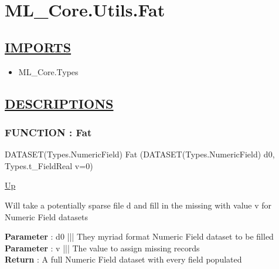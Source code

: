 \chapter*{ML\_Core.Utils.Fat}
\hypertarget{ecldoc:toc:ML_Core.Utils.Fat}{}

\section*{\underline{IMPORTS}}
\begin{itemize}
\item ML\_Core.Types
\end{itemize}

\section*{\underline{DESCRIPTIONS}}
\subsection*{FUNCTION : Fat}
\hypertarget{ecldoc:ml_core.utils.fat}{}
\begin{minipage}[t]{\textwidth}
\begin{flushleft}
DATASET(Types.NumericField) Fat (DATASET(Types.NumericField) d0, Types.t\_FieldReal v=0)
\end{flushleft}
\end{minipage}
\hyperlink{ecldoc:toc:ML_Core/Utils}{Up}

\par
Will take a potentially sparse file d and fill in the missing with value v for Numeric Field datasets
\par
\textbf{Parameter} : d0 ||| They myriad format Numeric Field dataset to be filled \\
\textbf{Parameter} : v ||| The value to assign missing records \\
\textbf{Return} : A full Numeric Field dataset with every field populated \\
